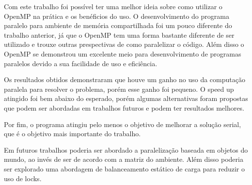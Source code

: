 \documentclass[12pt]{article}
\begin{document}
Com este trabalho foi possível ter uma melhor ideia sobre como utilizar o OpenMP na prática e os benéficios do uso. O desenvolvimento do programa paralelo para ambiente de memória compartilhada foi um pouco diferente do trabalho anterior, já que o OpenMP tem uma forma bastante diferente de ser utilizado e trouxe outras prespectivas de como paralelizar o código. Além disso o OpenMP se demonstrou um excelente meio para desenvolvimento de programas paralelos devido a sua facilidade de uso e eficiência.


Os resultados obtidos demonstraram que houve um ganho no uso da computação paralela para resolver o problema, porém esse ganho foi pequeno. O speed up atingido foi bem abaixo do esperado, porém algumas alternativas foram propostas que podem ser abordadas em trabalhos futuros e podem ter resultados melhores.

Por fim, o programa atingiu pelo menos o objetivo de melhorar a solução serial, que é o objetivo mais importante do trabalho.

Em futuros trabalhos poderia ser abordado a paralelização baseada em objetos do mundo, ao invés de ser de acordo com a matriz do ambiente. Além disso poderia ser explorado uma abordagem de balanceamento estático de carga para reduzir o uso de locks.



%
%
\end{document}
